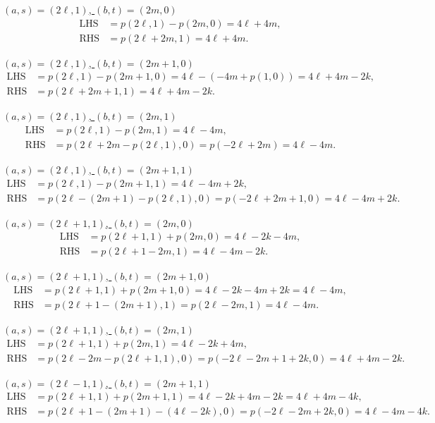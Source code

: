 \documentclass[12pt]{amsart}
\theoremstyle{definition}
\begin{document}
{\noindent\underline{$(a,s)=(2\ell,1)$, $(b,t)=(2m,0)$}
\begin{align*}
  \text{LHS} &= p(2\ell,1)-p(2m,0)=4\ell+4m,\\
  \text{RHS} &= p(2\ell+2m,1)=4\ell+4m.
\end{align*}

\noindent\underline{$(a,s)=(2\ell,1)$, $(b,t)=(2m+1,0)$}
\begin{align*}
  \text{LHS} &= p(2\ell,1)-p(2m+1,0)=4\ell-(-4m+p(1,0))=4\ell+4m-2k,\\
  \text{RHS} &= p(2\ell+2m+1,1)=4\ell+4m-2k. 
\end{align*}

\noindent\underline{$(a,s)=(2\ell,1)$, $(b,t)=(2m,1)$}
\begin{align*}
  \text{LHS} &= p(2\ell,1)-p(2m,1)=4\ell-4m,\\
  \text{RHS} &= p(2\ell+2m-p(2\ell,1),0)=p(-2\ell+2m)=4\ell-4m.
\end{align*}

\noindent\underline{$(a,s)=(2\ell,1)$, $(b,t)=(2m+1,1)$}
\begin{align*}
  \text{LHS} &= p(2\ell,1)-p(2m+1,1)=4\ell-4m+2k, \\
  \text{RHS} &= p(2\ell-(2m+1)-p(2\ell,1),0)
                                   =p(-2\ell+2m+1,0)=4\ell-4m+2k.
\end{align*}

\noindent\underline{$(a,s)=(2\ell+1,1)$, $(b,t)=(2m,0)$}
\begin{align*}
  \text{LHS} &= p(2\ell+1,1)+p(2m,0)=4\ell-2k-4m,\\
  \text{RHS} &= p(2\ell+1-2m,1)=4\ell-4m-2k.
\end{align*}

\noindent\underline{$(a,s)=(2\ell+1,1)$, $(b,t)=(2m+1,0)$}
\begin{align*}
  \text{LHS} &= p(2\ell+1,1)+p(2m+1,0)=4\ell-2k-4m+2k=4\ell-4m,\\
  \text{RHS} &= p(2\ell+1-(2m+1),1)=p(2\ell-2m,1)=4\ell-4m.
\end{align*}

\noindent\underline{$(a,s)=(2\ell+1,1)$, $(b,t)=(2m,1)$}
\begin{align*}
  \text{LHS} &= p(2\ell+1,1)+p(2m,1)=4\ell-2k+4m,\\
  \text{RHS} &= p(2\ell-2m-p(2\ell+1,1),0)
                                   =p(-2\ell-2m+1+2k,0)=4\ell+4m-2k.
\end{align*}

\noindent\underline{$(a,s)=(2\ell-1,1)$, $(b,t)=(2m+1,1)$}
\begin{align*}
  \text{LHS} &=  p(2\ell+1,1)+p(2m+1,1)=4\ell-2k+4m-2k=4\ell+4m-4k,\\
  \text{RHS} &= p(2\ell+1-(2m+1)-(4\ell-2k),0)
                                   =p(-2\ell-2m+2k,0)=4\ell-4m-4k.
\end{align*}
}
\end{document}
